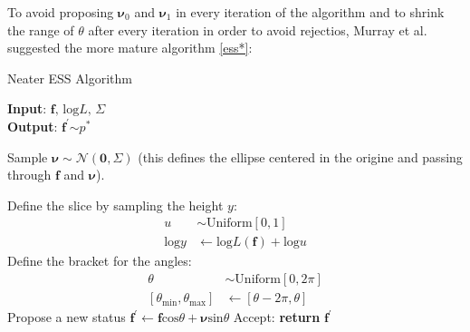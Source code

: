 \documentclass{article}
\begin{document}
To avoid proposing $\pmb{\nu}_{0}$ and $\pmb{\nu}_{1}$ in every iteration of the algorithm and to shrink the range of $\theta$ after every iteration in order to avoid rejectios, Murray et al. \cite{MAM} suggested the more mature algorithm \ref{ess*}:

\begin{algorithm}
\caption{Neater ESS Algorithm}\label{ess*}
\hspace*{\algorithmicindent} \textbf{Input}: $\mathbf{f},\,\text{log}L,\,\Sigma$ \\
\hspace*{\algorithmicindent} \textbf{Output}: $\mathbf{f^{'}}$$\sim p^*$
\begin{algorithmic}[1]
\State Sample $\pmb{\nu}\sim\mathcal{N}(\mathbf{0},\Sigma)$ (this defines the ellipse centered in the origine and passing through $\mathbf{f}$ and $\pmb{\nu}$).

\State Define the slice by sampling the height $y$:
\begin{align*}
u &\sim\text{Uniform}[0,1]\\
\text{log}y &\leftarrow \text{log}L(\mathbf{f})+\text{log}u
\end{align*}
\State Define the bracket for the angles:
\begin{align*}
\theta &\sim\text{Uniform}[0,2\pi]\\
[\theta_{\text{min}},\theta_{\text{max}}]&\leftarrow [\theta-2\pi,\theta]
\end{align*}
\State Propose a new status $\mathbf{f^{'}}\leftarrow\mathbf{f}\text{cos}\theta+\pmb{\nu}\text{sin}\theta$
    \State Accept: \textbf{return} $\mathbf{f^{'}}$
\end{algorithmic}
\end{algorithm}
\end{document}
